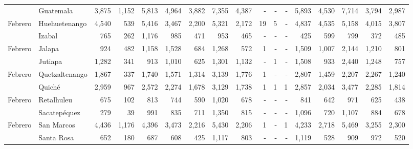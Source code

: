 \begin{landscape}
\begin{center}
\begin{longtable}{llrrrrrrrrrrrrrrr}
			\rowcolor{color1!5!white}\multicolumn{1}{l}{	\footnotesize	 Febrero 	}&	 Guatemala 	&	 3,875 	&	 1,152 	&	 5,813 	&	 4,964 	&	 3,882 	&	 7,355 	&	 4,387 	&	 -   	&	 -   	&	 -   	&	 5,893 	&	 4,530 	&	 7,714 	&	 3,794 	&	 2,987 	\\
			\multicolumn{1}{l}{	\footnotesize	 Febrero 	}&	 Huehuetenango 	&	 4,540 	&	 539 	&	 5,416 	&	 3,467 	&	 2,200 	&	 5,321 	&	 2,172 	&	 19 	&	 5 	&	 -   	&	 4,837 	&	 4,535 	&	 5,158 	&	 4,015 	&	 3,807 	\\
			\rowcolor{color1!5!white}\multicolumn{1}{l}{	\footnotesize	 Febrero 	}&	 Izabal 	&	 765 	&	 262 	&	 1,176 	&	 985 	&	 471 	&	 953 	&	 465 	&	 -   	&	 -   	&	 -   	&	 425 	&	 599 	&	 799 	&	 372 	&	 485 	\\
			\multicolumn{1}{l}{	\footnotesize	 Febrero 	}&	 Jalapa 	&	 924 	&	 482 	&	 1,158 	&	 1,528 	&	 684 	&	 1,268 	&	 572 	&	 1 	&	 -   	&	 -   	&	 1,509 	&	 1,007 	&	 2,144 	&	 1,210 	&	 801 	\\
			\rowcolor{color1!5!white}\multicolumn{1}{l}{	\footnotesize	 Febrero 	}&	 Jutiapa 	&	 1,282 	&	 341 	&	 913 	&	 1,010 	&	 625 	&	 1,301 	&	 1,132 	&	 -   	&	 1 	&	 -   	&	 1,508 	&	 933 	&	 2,440 	&	 1,248 	&	 757 	\\
			\multicolumn{1}{l}{	\footnotesize	 Febrero 	}&	 Quetzaltenango 	&	 1,867 	&	 337 	&	 1,740 	&	 1,571 	&	 1,314 	&	 3,139 	&	 1,776 	&	 1 	&	 -   	&	 -   	&	 2,807 	&	 1,459 	&	 2,207 	&	 2,267 	&	 1,240 	\\
			\rowcolor{color1!5!white}\multicolumn{1}{l}{	\footnotesize	 Febrero 	}&	 Quiché 	&	 2,959 	&	 967 	&	 2,572 	&	 2,274 	&	 1,678 	&	 3,129 	&	 1,738 	&	 1 	&	 1 	&	 1 	&	 2,857 	&	 2,034 	&	 3,477 	&	 2,285 	&	 1,814 	\\
			\multicolumn{1}{l}{	\footnotesize	 Febrero 	}&	 Retalhuleu 	&	 675 	&	 102 	&	 813 	&	 744 	&	 590 	&	 1,020 	&	 678 	&	 -   	&	 -   	&	 -   	&	 841 	&	 642 	&	 971 	&	 625 	&	 438 	\\
			\rowcolor{color1!5!white}\multicolumn{1}{l}{	\footnotesize	 Febrero 	}&	 Sacatepéquez 	&	 279 	&	 39 	&	 991 	&	 835 	&	 711 	&	 1,350 	&	 815 	&	 -   	&	 -   	&	 -   	&	 1,096 	&	 720 	&	 1,107 	&	 884 	&	 678 	\\
			\multicolumn{1}{l}{	\footnotesize	 Febrero 	}&	 San Marcos 	&	 4,436 	&	 1,176 	&	 4,396 	&	 3,473 	&	 2,216 	&	 5,430 	&	 2,206 	&	 1 	&	 -   	&	 1 	&	 4,233 	&	 2,718 	&	 5,469 	&	 3,255 	&	 2,300 	\\
			\rowcolor{color1!5!white}\multicolumn{1}{l}{	\footnotesize	 Febrero 	}&	 Santa Rosa 	&	 652 	&	 180 	&	 687 	&	 608 	&	 425 	&	 1,117 	&	 803 	&	 -   	&	 -   	&	 -   	&	 1,119 	&	 528 	&	 909 	&	 972 	&	 520 	\\

\end{longtable}
\end{center}
\end{landscape}
